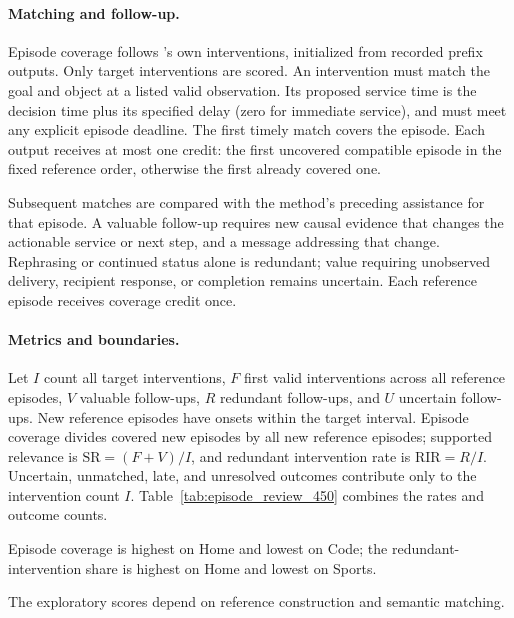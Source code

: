 \paragraph{Matching and follow-up.}
Episode coverage follows \system{}'s own interventions, initialized from recorded prefix outputs.
Only target interventions are scored.
An intervention must match the goal and object at a listed valid observation.
Its proposed service time is the decision time plus its specified delay (zero for immediate service), and must meet any explicit episode deadline.
The first timely match covers the episode.
Each output receives at most one credit: the first uncovered compatible episode in the fixed reference order, otherwise the first already covered one.

Subsequent matches are compared with the method's preceding assistance for that episode.
A valuable follow-up requires new causal evidence that changes the actionable service or next step, and a message addressing that change.
Rephrasing or continued status alone is redundant; value requiring unobserved delivery, recipient response, or completion remains uncertain.
Each reference episode receives coverage credit once.

\paragraph{Metrics and boundaries.}
Let $I$ count all target interventions, $F$ first valid interventions across all reference episodes, $V$ valuable follow-ups, $R$ redundant follow-ups, and $U$ uncertain follow-ups.
New reference episodes have onsets within the target interval.
Episode coverage divides covered new episodes by all new reference episodes; supported relevance is $\mathrm{SR}=(F+V)/I$, and redundant intervention rate is $\mathrm{RIR}=R/I$.
Uncertain, unmatched, late, and unresolved outcomes contribute only to the intervention count $I$.
Table~\ref{tab:episode_review_450} combines the rates and outcome counts.

Episode coverage is highest on Home and lowest on Code; the redundant-intervention share is highest on Home and lowest on Sports.

The exploratory scores depend on reference construction and semantic matching.

\FloatBarrier
